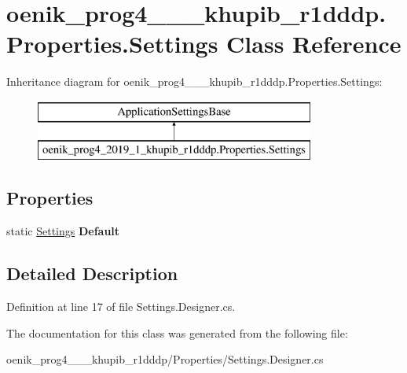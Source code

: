 \hypertarget{classoenik__prog4__2019__1__khupib__r1dddp_1_1_properties_1_1_settings}{}\section{oenik\+\_\+prog4\+\_\+\_\+\_\+khupib\+\_\+r1dddp.\+Properties.\+Settings Class Reference}
\label{classoenik__prog4__2019__1__khupib__r1dddp_1_1_properties_1_1_settings}
Inheritance diagram for oenik\+\_\+prog4\+\_\+\_\+\_\+khupib\+\_\+r1dddp.\+Properties.\+Settings\+:\begin{figure}[H]
\begin{center}
\leavevmode
\includegraphics[height=2.000000cm]{classoenik__prog4__2019__1__khupib__r1dddp_1_1_properties_1_1_settings}
\end{center}
\end{figure}
\subsection*{Properties}
\begin{DoxyCompactItemize}
\item 
\mbox{\label{classoenik__prog4__2019__1__khupib__r1dddp_1_1_properties_1_1_settings_a5179e8788c0d0cf4ec0feaf7a363eb89}} 
static \mbox{\hyperlink{classoenik__prog4__2019__1__khupib__r1dddp_1_1_properties_1_1_settings}{Settings}} {\bfseries Default}
\end{DoxyCompactItemize}


\subsection{Detailed Description}


Definition at line 17 of file Settings.\+Designer.\+cs.



The documentation for this class was generated from the following file\+:\begin{DoxyCompactItemize}
\item 
oenik\+\_\+prog4\+\_\+\_\+\_\+khupib\+\_\+r1dddp/\+Properties/Settings.\+Designer.\+cs\end{DoxyCompactItemize}
